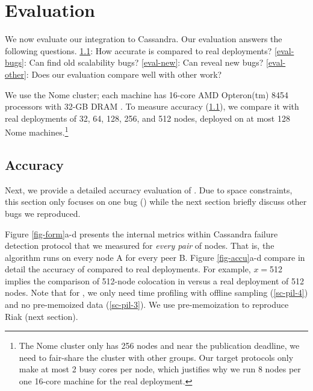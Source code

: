 
\section{Evaluation}
\label{sec-eval}


We now evaluate our \sck integration to Cassandra. Our evaluation answers the
following questions.
%
\sec\ref{eval-accu}: How accurate is \sck compared to real deployments?
%
\sec\ref{eval-bugs}: Can \sck find old scalability bugs?
%
\sec\ref{eval-new}: Can \sck reveal new bugs?
%
%
\sec\ref{eval-other}: Does our evaluation compare well with other work?


We use the Nome cluster; each machine has 16-core AMD Opteron(tm) 8454
processors with 32-GB DRAM \cite{NomeNodes}.
%
To measure \sck accuracy (\sec\ref{eval-accu}), we compare it with real
deployments of 32, 64, 128, 256, and 512 nodes, deployed on at most 128 Nome
machines.\footnote{The Nome cluster only has 256 nodes and near the publication
deadline, we need to fair-share the cluster with other groups.  Our target
protocols only make at most 2 busy cores per node, which justifies why we run 8
nodes per one 16-core machine for the real deployment.}
%

\subsection{Accuracy}
\label{eval-accu}

\def \fff        {$f$}
\def \flaps      {\textit{\#flaps}\xspace}
\def \gosLast    {$T_{lastGossip}$\xspace}
\def \gosAvg     {$T_{avgGossip}$\xspace}
\def \gosProc    {$T_{gossipExec}$\xspace}
\def \supProc    {$T_{stateUpdate}$\xspace}
\def \hops       {\textit{\#hops}\xspace}

\def \ringTable  {$Size_{ringTable}$\xspace}
\def \newStates  {$Size_{newStates}$\xspace}
\def \cpuSpeed   {$CPU$\xspace}


Next, we provide a detailed accuracy evaluation of \sck.  Due to space
constraints, this section only focuses on one bug (\caone \cite{CA-One}) 
while the next
section briefly discuss other bugs we reproduced.




Figure \ref{fig-form}a-d presents the  internal metrics within
Cassandra failure detection protocol that we measured for {\em every pair}
of nodes.  That is, the algorithm runs on every node A for every peer B.
%
Figure \ref{fig-accu}a-d compare in detail the accuracy of \sck compared
to real deployments.
%
For example, $x$$=$512 implies the comparison of 512-node colocation in
\sck versus a real deployment of 512 nodes.
%
Note that for \caone, we only need time profiling with offline sampling
(\sec\ref{sc-pil-4}) and no pre-memoized data (\sec\ref{sc-pil-3}).  
%
We use pre-memoization to reproduce Riak \riakone (next section).



